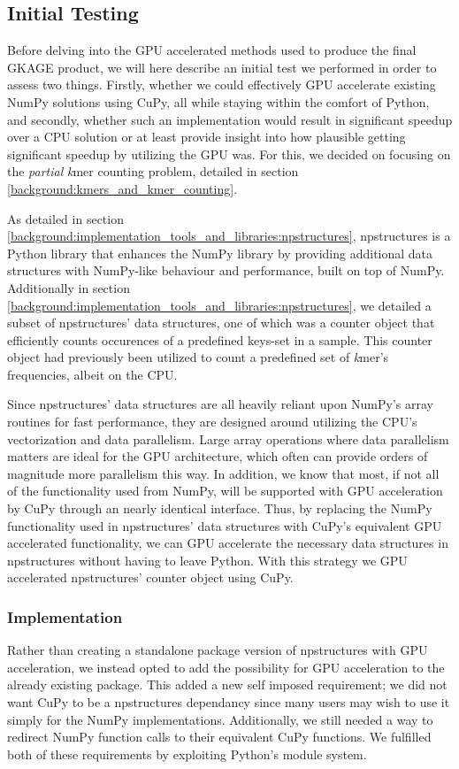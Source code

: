 \subsection{Initial Testing} \label{methods:initial_testing}
Before delving into the GPU accelerated methods used to produce the final GKAGE product, we will here describe an initial test we performed in order to assess two things. Firstly, whether we could effectively GPU accelerate existing NumPy solutions using CuPy, all while staying within the comfort of Python, and secondly, whether such an implementation would result in significant speedup over a CPU solution or at least provide insight into how plausible getting significant speedup by utilizing the GPU was.
For this, we decided on focusing on the \textit{partial} \textit{k}mer counting problem, detailed in section \ref{background:kmers_and_kmer_counting}.

As detailed in section \ref{background:implementation_tools_and_libraries:npstructures}, npstructures is a Python library that enhances the NumPy library by providing additional data structures with NumPy-like behaviour and performance, built on top of NumPy.
Additionally in section \ref{background:implementation_tools_and_libraries:npstructures}, we detailed a subset of npstructures' data structures, one of which was a counter object that efficiently counts occurences of a predefined keys-set in a sample.
This counter object had previously been utilized to count a predefined set of \textit{k}mer's frequencies, albeit on the CPU.

Since npstructures' data structures are all heavily reliant upon NumPy's array routines for fast performance, they are designed around utilizing the CPU's vectorization and data parallelism.
Large array operations where data parallelism matters are ideal for the GPU architecture, which often can provide orders of magnitude more parallelism this way.
In addition, we know that most, if not all of the functionality used from NumPy, will be supported with GPU acceleration by CuPy through an nearly identical interface.
Thus, by replacing the NumPy functionality used in npstructures' data structures with CuPy's equivalent GPU accelerated functionality, we can GPU accelerate the necessary data structures in npstructures without having to leave Python.
With this strategy we GPU accelerated npstructures' counter object using CuPy.

\subsubsection{Implementation}
Rather than creating a standalone package version of npstructures with GPU acceleration, we instead opted to add the possibility for GPU acceleration to the already existing package.
This added a new self imposed requirement; we did not want CuPy to be a npstructures dependancy since many users may wish to use it simply for the NumPy implementations.
Additionally, we still needed a way to redirect NumPy function calls to their equivalent CuPy functions.
We fulfilled both of these requirements by exploiting Python's module system.

